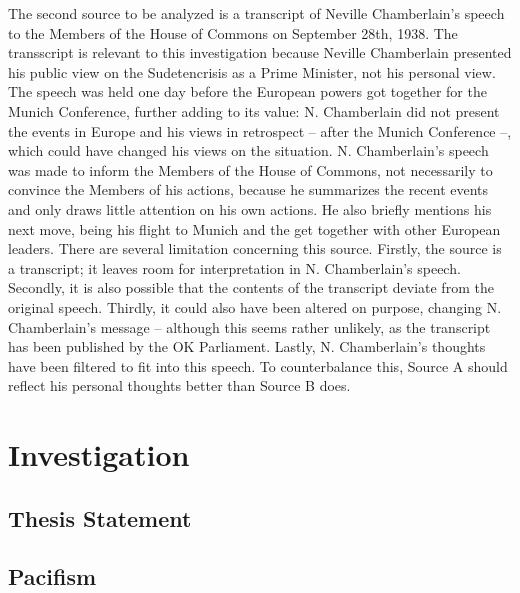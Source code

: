 \documentclass[10pt, a4papert, hidelinks]{article}
\begin{document}
The second source to be analyzed is a transcript of Neville Chamberlain's speech to the Members of the House of Commons on September 28th, 1938.
The transscript is relevant to this investigation because Neville Chamberlain presented his public view on the Sudetencrisis as a Prime Minister, not his personal view.
The speech was held one day before the European powers got together for the Munich Conference, further adding to its value: N. Chamberlain did not present the events in Europe and his views in retrospect -- after the Munich Conference --, which could have changed his views on the situation.
N. Chamberlain's speech was made to inform the Members of the House of Commons, not necessarily to convince the Members of his actions, because he summarizes the recent events and only draws little attention on his own actions. He also briefly mentions his next move, being his flight to Munich and the get together with other European leaders.
There are several limitation concerning this source.
Firstly, the source is a transcript; it leaves room for interpretation in N. Chamberlain's speech. Secondly, it is also possible that the contents of the transcript deviate from the original speech. Thirdly, it could also have been altered on purpose, changing N. Chamberlain's message -- although this seems rather unlikely, as the transcript has been published by the OK Parliament. Lastly, N. Chamberlain's thoughts have been filtered to fit into this speech. To counterbalance this, Source A should reflect his personal thoughts better than Source B does.
\cite{prime_minister_statement_common_sittings_european_situation}

\section{Investigation}
\subsection{Thesis Statement}


\subsection{Pacifism}
\end{document}
